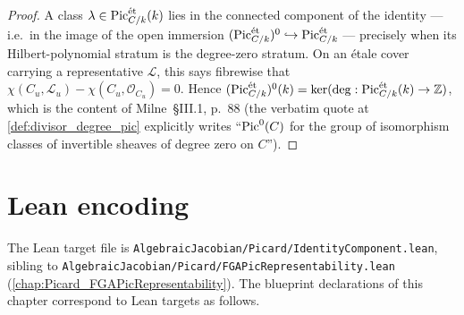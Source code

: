 \begin{proof}
  A class
  \(\lambda \in \operatorname{Pic}^{\mathrm{\acute{e}t}}_{C/k}(k)\) lies in the connected component of
  the identity --- i.e.\ in the image of the open immersion
  \((\operatorname{Pic}^{\mathrm{\acute{e}t}}_{C/k})^0\hookrightarrow\operatorname{Pic}^{\mathrm{\acute{e}t}}_{C/k}\) --- precisely
  when its Hilbert-polynomial stratum is the degree-zero stratum.
  On an \'etale cover carrying a representative \(\mathcal L\), this says
  fibrewise that
  \(\chi(C_u,\mathcal L_u)-\chi(C_u,\mathcal O_{C_u})=0\).
  Hence
  \((\operatorname{Pic}^{\mathrm{\acute{e}t}}_{C/k})^0(k)
    =\ker(\deg:\operatorname{Pic}^{\mathrm{\acute{e}t}}_{C/k}(k)\to\mathbb Z)\),
  which is the content of Milne~\S III.1, p.~88 (the verbatim quote
  at \cref{def:divisor_degree_pic} explicitly writes ``\(\operatorname{Pic}^0(C)\)
  for the group of isomorphism classes of invertible sheaves of degree
  zero on \(C\)'').
\end{proof}

\section{Lean encoding}
\label{sec:pic0_lean_encoding}

The Lean target file is
\texttt{AlgebraicJacobian/Picard/IdentityComponent.lean}, sibling to
\texttt{AlgebraicJacobian/Picard/FGAPicRepresentability.lean}
(\cref{chap:Picard_FGAPicRepresentability}). The blueprint declarations
of this chapter correspond to Lean targets as follows.

